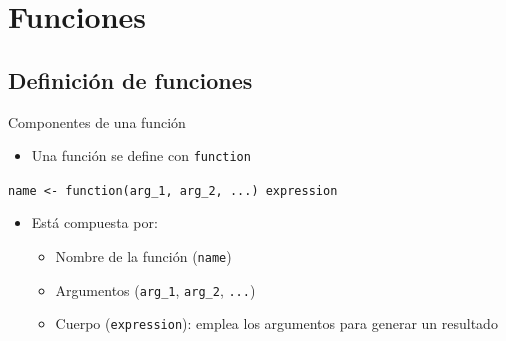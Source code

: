 \documentclass[aspectratio=169, usenames,svgnames,dvipsnames]{beamer}
\begin{document}
\section{Funciones}
\label{sec:org70f7dc4}
\subsection{Definición de funciones}
\label{sec:org1aadfb6}
\begin{frame}[label={sec:orga4b3159},fragile]{Componentes de una función}
 \begin{itemize}
\item Una función se define con \texttt{function}
\end{itemize}
\begin{center}
\texttt{name <- function(arg\_1, arg\_2, ...) expression}
\end{center}
\begin{itemize}
\item Está compuesta por:
\begin{itemize}
\item Nombre de la función (\texttt{name})
\item Argumentos (\texttt{arg\_1}, \texttt{arg\_2}, \texttt{...})
\item Cuerpo (\texttt{expression}): emplea los argumentos para generar un resultado
\end{itemize}
\end{itemize}
\end{frame}
\end{document}

